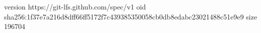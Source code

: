 version https://git-lfs.github.com/spec/v1
oid sha256:1f37e7a216d8dff66ff5172f7c439385350058cb0db8edabc23021488c51e9e9
size 196704
